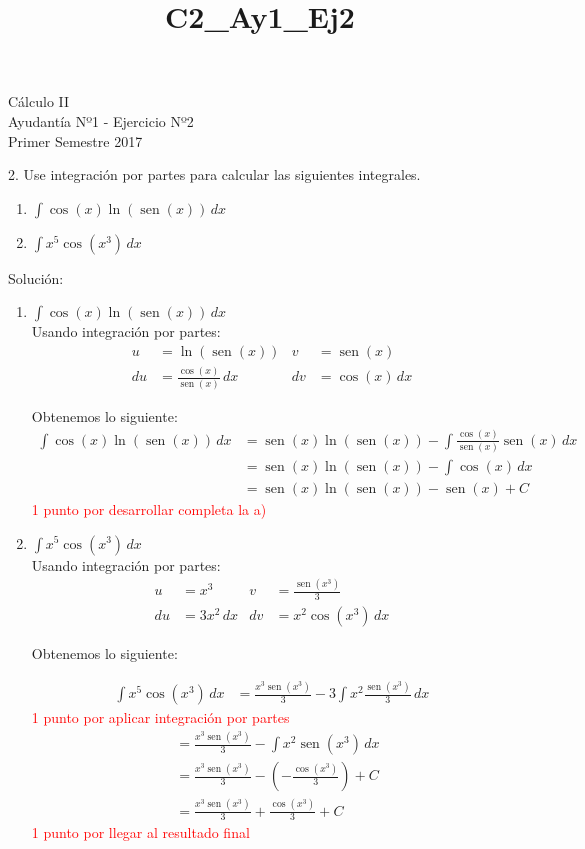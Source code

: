 \documentclass[a4paper,10pt]{article}
\title{C2_Ay1_Ej2}
\newcommand{\dis}{\displaystyle}
\def\sin{\operatorname{sen}}
\begin{document}
\begin{center}
Cálculo II\\
Ayudantía Nº1 - Ejercicio Nº2\\
Primer Semestre 2017
\end{center}





2. Use integraci\'{o}n por partes para calcular las siguientes
integrales.
\begin{enumerate}[label=\emph{\alph*)}]
\item $\dis \int \cos(x) \ln(\sin(x))\, dx$
\item $\dis \int x^5\cos(x^3)\, dx$
\end{enumerate}


\vspace{5mm}

Solución:

\begin{enumerate}[label=\emph{\alph*)}]
\item $\dis \int \cos(x) \ln(\sin(x))\, dx$\\

Usando integración por partes:
\begin{align*}
 u  &=  \ln(\sin(x))  &   v  &= \sin(x) \\
 du &= \frac{\cos(x)}{\sin(x)} \, dx     &   dv &= \cos(x) \, dx
\end{align*}

Obtenemos lo siguiente:
\begin{align*}
 \dis \int \cos(x) \ln(\sin(x))\, dx &= \sin(x) \ln(\sin(x)) - \dis \int \frac{\cos(x)}{\sin(x)}\sin(x) \, dx \\
      &=  \sin(x) \ln(\sin(x)) - \dis \int \cos(x) \, dx \\
       &= \sin(x) \ln(\sin(x)) - \sin(x) +C
\end{align*}
\textcolor{red}{1 punto por desarrollar completa la a)}

\item $\dis \int x^5\cos(x^3)\, dx$\\
Usando integración por partes:
\begin{align*}
 u  &=  x^3  &   v  &= \frac{\sin(x^3)}{3} \\
 du &= 3x^2 \, dx     &   dv &= x^2\cos(x^3) \, dx
\end{align*}

Obtenemos lo siguiente:

\begin{align*}
 \dis \int x^5\cos(x^3)\, dx &= \frac{x^3\sin(x^3)}{3} - 3 \dis \int x^2 \frac{\sin(x^3)}{3} \, dx
 \end{align*}
 \textcolor{red}{1 punto por aplicar integración por partes}
 \begin{align*}
      &=  \frac{x^3\sin(x^3)}{3} - \dis \int x^2 \sin(x^3) \, dx \\
       &=  \frac{x^3\sin(x^3)}{3} - (- \frac{\cos(x^3)}{3}) + C \\
       &=  \frac{x^3\sin(x^3)}{3} + \frac{\cos(x^3)}{3} + C
\end{align*}
\textcolor{red}{1 punto por llegar al resultado final}
\end{enumerate}
\end{document}
